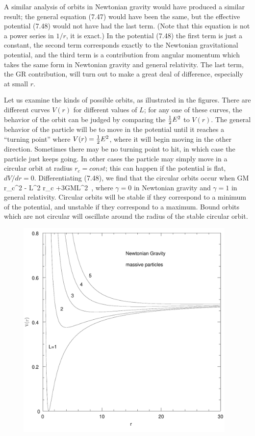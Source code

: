 \documentclass[12pt]{article}
\begin{document}
A similar analysis of orbits in Newtonian gravity would have produced
a similar result; the general equation (7.47) would have been the
same, but the effective potential (7.48) would not have had the last
term.  (Note that this equation is not a power series in $1/r$, it is
exact.)  In the potential (7.48) the first term is just a constant, the
second term corresponds exactly to the Newtonian gravitational potential,
and the third term is a contribution from angular momentum which takes
the same form in Newtonian gravity and general relativity.  The last term,
the GR contribution, will turn out to make a great deal of difference,
especially at small $r$.

Let us examine the kinds of possible orbits, as illustrated in the
figures.  There are different curves $V(r)$ for different values
of $L$; for any one of these curves, the behavior of the orbit can be
judged by comparing the ${1\over 2}E^2$ to $V(r)$.  The general behavior of
the particle will be to move in the potential until it reaches a
``turning point'' where $V(r)={1\over 2}E^2$, where it will begin moving 
in the other direction.  Sometimes there may be no turning point to hit,
in which case the particle just keeps going.  In other cases the
particle may simply move in a circular orbit at radius $r_c= const$; this 
can happen if the potential is flat, $dV/dr=0$.  Differentiating
(7.48), we find that the circular orbits occur when
\be
  \epsilon GM r_c^2 - L^2 r_c +3GML^2\ ,\label{7.49}
\ee
where $\gamma=0$ in Newtonian gravity and $\gamma=1$ in general
relativity.  Circular orbits will be stable if they correspond to
a minimum of the potential, and unstable if they correspond to a
maximum.  Bound orbits which are not circular will oscillate
around the radius of the stable circular orbit.

\begin{figure}
  \centerline{
  \includegraphics[height=11cm]{pdf/seven4}}
  \vskip-2cm
\end{figure}
\end{document}
